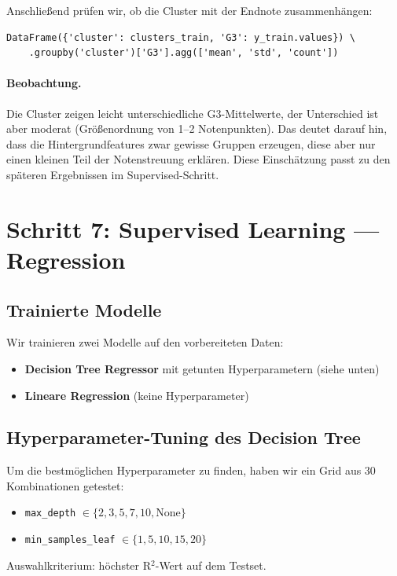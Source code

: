 \documentclass[11pt,a4paper]{article}
\begin{document}
Anschließend prüfen wir, ob die Cluster mit der Endnote zusammenhängen:
\begin{verbatim}
DataFrame({'cluster': clusters_train, 'G3': y_train.values}) \
    .groupby('cluster')['G3'].agg(['mean', 'std', 'count'])
\end{verbatim}

\paragraph{Beobachtung.} Die Cluster zeigen leicht unterschiedliche G3-Mittelwerte, der Unterschied ist aber moderat (Größenordnung von 1--2 Notenpunkten). Das deutet darauf hin, dass die Hintergrundfeatures zwar gewisse Gruppen erzeugen, diese aber nur einen kleinen Teil der Notenstreuung erklären. Diese Einschätzung passt zu den späteren Ergebnissen im Supervised-Schritt.

\section{Schritt 7: Supervised Learning --- Regression}

\subsection{Trainierte Modelle}
Wir trainieren zwei Modelle auf den vorbereiteten Daten:
\begin{itemize}
    \item \textbf{Decision Tree Regressor} mit getunten Hyperparametern (siehe unten)
    \item \textbf{Lineare Regression} (keine Hyperparameter)
\end{itemize}

\subsection{Hyperparameter-Tuning des Decision Tree}
Um die bestmöglichen Hyperparameter zu finden, haben wir ein Grid aus 30 Kombinationen getestet:
\begin{itemize}
    \item \texttt{max\_depth} $\in \{2, 3, 5, 7, 10, \text{None}\}$
    \item \texttt{min\_samples\_leaf} $\in \{1, 5, 10, 15, 20\}$
\end{itemize}
Auswahlkriterium: höchster R$^{2}$-Wert auf dem Testset.
\end{document}
